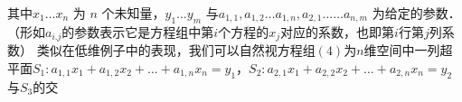 其中$x_1\dots x_n$ 为 $n$ 个未知量，$y_1\dots y_m$ 与$a_{1,1} ,a_{1,2}\dots a_{1,n},a_{2,1} \dots\dots a_{n,m}$ 为给定的参数．（形如$a_{i.j}$的参数表示它是方程组中第$i$个方程的$x_j$对应的系数，也即第$i$行第$j$列系数）
类似在低维例子中的表现，我们可以自然视方程组$(4)$为$n$维空间中一列超平面$S_1:a_{1,1}x_1 + a_{1,2}x_2 + \dots + a_{1,n}x_n=y_1$，$S_2:a_{2,1}x_1 + a_{2,2}x_2 + \dots + a_{2,n}x_n=y_2$与$S_3$的交